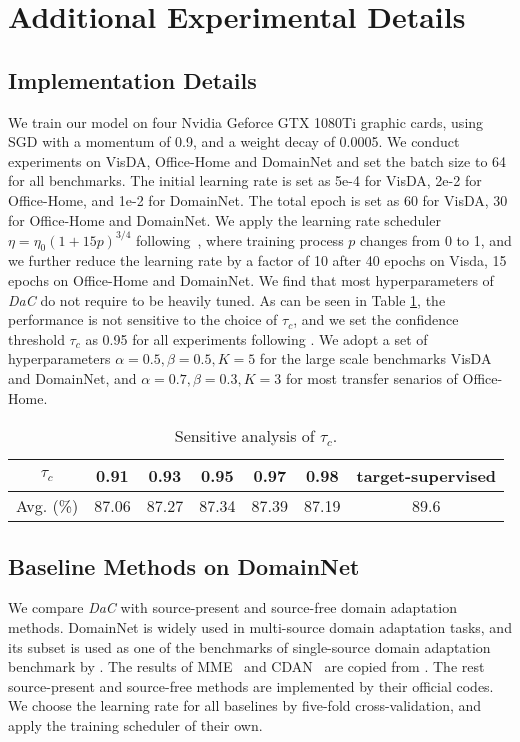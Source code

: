 \documentclass{article}
\begin{document}
\section{Additional Experimental Details}\label{supple_details}
\subsection{Implementation Details}
We train our model on four Nvidia Geforce GTX 1080Ti graphic cards, using SGD with a momentum of 0.9, and a weight decay of 0.0005. We conduct experiments on VisDA, Office-Home and DomainNet and set the batch size to 64 for all benchmarks. The initial learning rate is set as 5e-4 for VisDA, 2e-2 for Office-Home, and 1e-2 for DomainNet. The total epoch is set as 60 for VisDA, 30 for Office-Home and DomainNet. 
We apply the learning rate scheduler $\eta = \eta_0(1+15p)^{3/4}$ following~\cite{shot}, where training process $p$ changes from 0 to 1, and we further reduce the learning rate by a factor of 10 after 40 epochs on Visda, 15 epochs on Office-Home and DomainNet. We find that most hyperparameters of \textit{DaC} do not require to be heavily tuned. As can be seen in Table \ref{tab:sensitive}, the performance is not sensitive to the choice of $\tau_c$, and we set the confidence threshold $\tau_c$ as 0.95 for all experiments following \cite{fixmatch,li2021semiuda}.
We adopt a set of hyperparameters $\alpha=0.5,\beta=0.5,K=5$ for the large scale benchmarks VisDA and DomainNet, and $\alpha=0.7,\beta=0.3,K=3$ for most transfer senarios of Office-Home. 
\begin{table}[!htbp]
    \vspace{-3mm}
    \centering
    \caption{Sensitive analysis of $\tau_c$.}
    \label{tab:sensitive}
    \begin{tabular}{ccccccc}
					\toprule
					$\tau_c$ & 0.91 &	0.93 & 0.95 & 0.97 & 	0.98 &	target-supervised   \\
					\midrule
					\multicolumn{1}{c}{Avg. (\%)} & 87.06 &	87.27 &	87.34 & 87.39 &	87.19 &	89.6\\
					\bottomrule
		\end{tabular}

    \vspace{-3mm}
\end{table}

\subsection{Baseline Methods on DomainNet}
We compare \textit{DaC} with source-present and source-free domain adaptation methods.
DomainNet is widely used in multi-source domain adaptation tasks, and its subset is used as one of the benchmarks of single-source domain adaptation benchmark by \cite{saito2019semidomainnet}. The results of MME~\cite{saito2019semidomainnet} and CDAN~\cite{long2018conditional} are copied from \cite{saito2019semidomainnet}. The rest source-present and source-free methods are implemented by their official codes. We choose the learning rate for all baselines by five-fold cross-validation, and apply the training scheduler of their own. 
\end{document}
